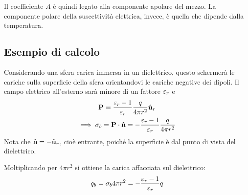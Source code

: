 Il coefficiente $A$ è quindi legato alla componente apolare del mezzo.
La componente polare della suscettività elettrica, invece, è quella che dipende dalla temperatura.

\subsection{Esempio di calcolo}

Considerando una sfera carica immersa in un dielettrico, questo schermerà le cariche sulla superficie della sfera orientandovi le cariche negative dei dipoli.
Il campo elettrico all'esterno sarà minore di un fattore $\varepsilon_r$ e
\begin{gather}
    \mathbf{P} = \frac{\varepsilon_r - 1}{\varepsilon_r} \frac{q}{4\pi r^2} \hat{\mathbf{u}}_{r} \\
    \implies \sigma_b = \mathbf{P} \cdot \hat{\mathbf{n}}
    = -\frac{\varepsilon_r - 1}{\varepsilon_r} \frac{q}{4\pi r^2}
\end{gather}
Nota che $\hat{\mathbf{n}} = - \hat{\mathbf{u}}_{r}$, cioè entrante, poiché la superficie è dal punto di vista del dielettrico.

Moltiplicando per $4\pi r^2$ si ottiene la carica affacciata sul dielettrico:
\begin{equation}
    q_b = \sigma_b 4\pi r^2 = - \frac{\varepsilon_r - 1}{\varepsilon_r} q
\end{equation}
